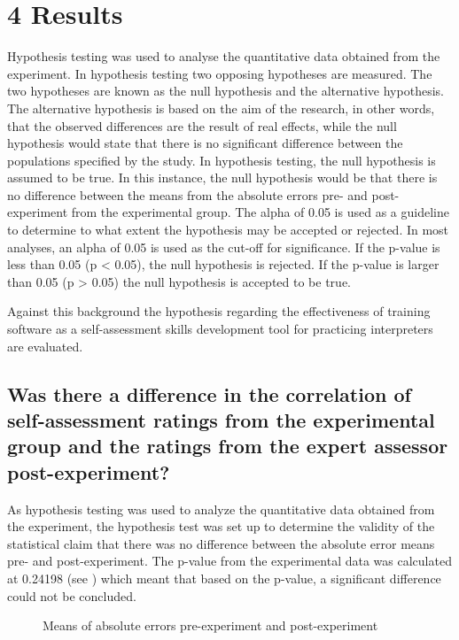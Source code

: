 \documentclass[output=paper]{langsci/langscibook}
\begin{document}
\section{4 Results}
Hypothesis testing was used to analyse the quantitative data obtained from the experiment. In hypothesis testing two opposing hypotheses are measured. The two hypotheses are known as the null hypothesis and the alternative hypothesis. The alternative hypothesis is based on the aim of the research, in other words, that the observed differences are the result of real effects, while the null hypothesis would state that there is no significant difference between the populations specified by the study. In hypothesis testing, the null hypothesis is assumed to be true. In this instance, the null hypothesis would be that there is no difference between the means from the absolute errors pre- and post-experiment from the experimental group. The alpha of 0.05 is used as a guideline to determine to what extent the hypothesis may be accepted or rejected. In most analyses, an alpha of 0.05 is used as the cut-off for significance. If the p-value is less than 0.05 (p < 0.05), the null hypothesis is rejected. If the p-value is larger than 0.05 (p > 0.05) the null hypothesis is accepted to be true. 


Against this background the hypothesis regarding the effectiveness of training software as a self-assessment skills development tool for practicing interpreters are evaluated.


\subsection{Was there a difference in the correlation of self-assessment ratings from the experimental group and the ratings from the expert assessor post-experiment?}

As hypothesis testing was used to analyze the quantitative data obtained from the experiment, the hypothesis test was set up to determine the validity of the statistical claim that there was no difference between the absolute error means pre- and post-experiment. The p-value from the experimental data was calculated at 0.24198 (see ) which meant that based on the p-value, a significant difference could not be concluded.


\begin{figure}
\caption{Means of absolute errors pre-experiment and post-experiment}
\end{figure}
\end{document}
